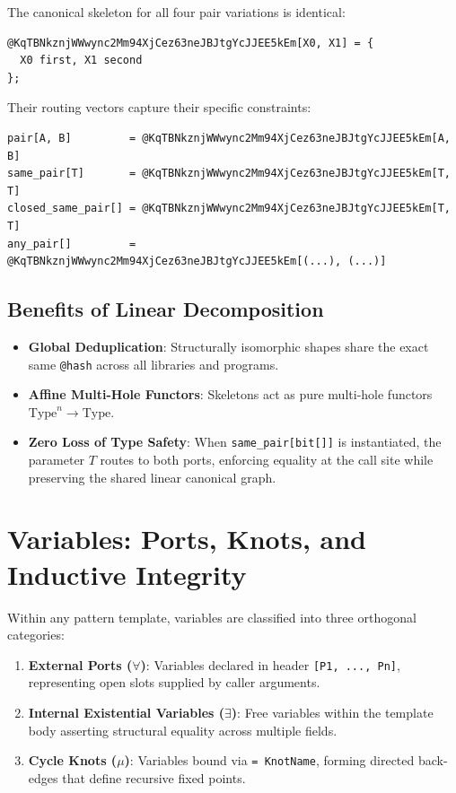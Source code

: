 \documentclass[11pt,a4paper]{article}
\begin{document}
The canonical skeleton for all four pair variations is identical:
\begin{lstlisting}[language=k]
@KqTBNkznjWWwync2Mm94XjCez63neJBJtgYcJJEE5kEm[X0, X1] = {
  X0 first, X1 second
};
\end{lstlisting}

Their routing vectors capture their specific constraints:
\begin{lstlisting}[basicstyle=\ttfamily\small]
pair[A, B]         = @KqTBNkznjWWwync2Mm94XjCez63neJBJtgYcJJEE5kEm[A, B]
same_pair[T]       = @KqTBNkznjWWwync2Mm94XjCez63neJBJtgYcJJEE5kEm[T, T]
closed_same_pair[] = @KqTBNkznjWWwync2Mm94XjCez63neJBJtgYcJJEE5kEm[T, T]
any_pair[]         = @KqTBNkznjWWwync2Mm94XjCez63neJBJtgYcJJEE5kEm[(...), (...)]
\end{lstlisting}

\subsection{Benefits of Linear Decomposition}

\begin{itemize}
  \item \textbf{Global Deduplication}: Structurally isomorphic shapes share the exact same \lstinline|@hash| across all libraries and programs.
  \item \textbf{Affine Multi-Hole Functors}: Skeletons act as pure multi-hole functors $\text{Type}^n \to \text{Type}$.
  \item \textbf{Zero Loss of Type Safety}: When \lstinline|same_pair[bit[]]| is instantiated, the parameter $T$ routes to both ports, enforcing equality at the call site while preserving the shared linear canonical graph.
\end{itemize}

\section{Variables: Ports, Knots, and Inductive Integrity}

Within any pattern template, variables are classified into three orthogonal categories:

\begin{enumerate}
  \item \textbf{External Ports ($\forall$)}: Variables declared in header \lstinline|[P1, ..., Pn]|, representing open slots supplied by caller arguments.
  \item \textbf{Internal Existential Variables ($\exists$)}: Free variables within the template body asserting structural equality across multiple fields.
  \item \textbf{Cycle Knots ($\mu$)}: Variables bound via \lstinline|= KnotName|, forming directed back-edges that define recursive fixed points.
\end{enumerate}
\end{document}
